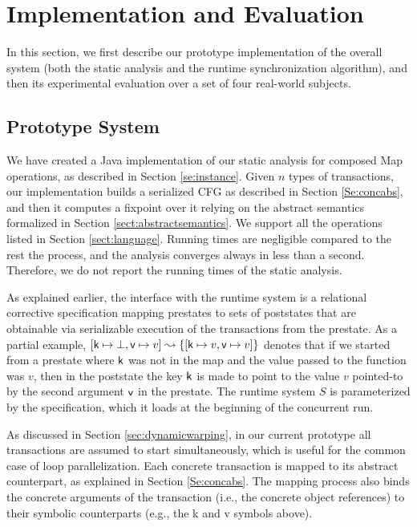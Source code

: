 \section{Implementation and Evaluation}\label{Se:experiments}

In this section, we first describe our prototype implementation of the overall system (both the static analysis and the runtime synchronization algorithm), and then its experimental evaluation over a set of four real-world subjects. 

\subsection{Prototype System}
\label{Se:system}

We have created a Java implementation of our static analysis for composed {\sf Map} operations, as described  in Section \ref{se:instance}. Given $n$ types of transactions, our implementation builds a serialized CFG as described in Section \ref{Se:concabs}, and then it computes a fixpoint over it relying on the abstract semantics formalized in Section \ref{sect:abstractsemantics}. We support all the operations listed in Section \ref{sect:language}. Running times are negligible compared to the rest the process, and the analysis converges always in less than a second. Therefore, we do not report the running times of the static analysis.

As explained earlier, the interface with the runtime system is a relational corrective specification mapping prestates to sets of poststates that are obtainable via serializable execution of the transactions from the prestate. As a partial example, 
$[ {\sf k} \mapsto \bot , {\sf v} \mapsto v ] \leadsto \{ [ {\sf k} \mapsto v , {\sf v} \mapsto v ] \}$
denotes that if we started from a prestate where ${\sf k}$ was not in the map and the value passed to the function was $v$, then in the poststate the key ${\sf k}$ is made to point to the value $v$ pointed-to by the second argument ${\sf v}$ in the prestate.
%
The runtime system $S$ is parameterized by the specification, which it loads at the beginning of the concurrent run. 

As discussed in Section \ref{sec:dynamicwarping}, in our current prototype all transactions are assumed to start simultaneously, which is useful for the common case of loop parallelization. Each concrete transaction is mapped to its abstract counterpart, as explained in Section \ref{Se:concabs}. The mapping process also binds the concrete arguments of the transaction (i.e., the concrete object references) to their symbolic counterparts (e.g., the {\sf k} and {\sf v} symbols above). 

